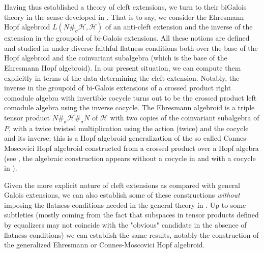 \documentclass[a4paper,reqno]{amsart}
\numberwithin{equation}{section}
\theoremstyle{plain}
\theoremstyle{remark}
\numberwithin{equation}{section}
\newcommand{\CH}{\mathcal{H}}
\begin{document}
Having thus established a theory of cleft extensions, we turn to their biGalois theory in the sense developed in \cite{HS25}. That is to say, we consider the Ehresmann Hopf algebroid $L(N\#_\sigma\CH,\CH)$ of an anti-cleft extension and the inverse of the extension in the groupoid of bi-Galois extensions. All these notions are defined and studied in \cite{HS25} under diverse faithful flatness conditions both over the base of the Hopf algebroid and the coinvariant subalgebra (which is the base of the Ehresmann Hopf algebroid). In our present situation, we can compute them explicitly in terms of the data determining the cleft extension. Notably, the inverse in the groupoid of bi-Galois extensions of a crossed product right comodule algebra with invertible cocycle turns out to be the crossed product left comodule algebra using the inverse cocycle. The Ehresmann algebroid is a triple tensor product $N\#_\sigma\CH\#_\sigma N$ of $\CH$ with two copies of the coinvariant subalgebra of $P$, with a twice twisted multiplication using the action (twice) and the cocycle and its inverse; this is a Hopf algebroid generalization of the so called Connes-Moscovici Hopf algebroid constructed from a crossed product over a Hopf algebra (see \cite{connes-moscovici}, the algebraic construction appears without a cocycle in \cite{Takeuchi77} and with a cocycle in \cite{schau4}).

Given the more explicit nature of cleft extensions as compared with general Galois extensions, we can also establish some of these constructions \emph{without} imposing the flatness conditions needed in the general theory in \cite{HS25}. Up to some subtleties (mostly coming from the fact that subspaces in tensor products defined by equalizers may not coincide with the "obvious" candidate in the absence of flatness conditions) we can establish the same results, notably the construction of the generalized Ehresmann or Connes-Moscovici Hopf algebroid.
\end{document}
